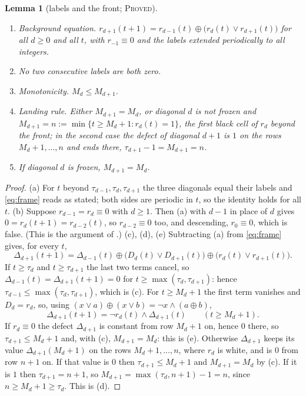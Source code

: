 \documentclass[11pt]{article}
\newtheorem{lemma}[theorem]{Lemma}
\theoremstyle{definition}
\theoremstyle{remark}
\newcommand{\PROVED}{\textsc{Proved}}
\begin{document}
\begin{lemma}[labels and the front; \PROVED]\label{lem:front}
\begin{enumerate}[label=(\alph*),leftmargin=*,itemsep=1pt]
\item \emph{Background equation.} $r_{d+1}(t+1)=r_{d-1}(t)\oplus\bigl(r_d(t)\vee r_{d+1}(t)\bigr)$ for all $d\ge0$ and all $t$, with $r_{-1}\equiv0$ and the labels extended periodically to all integers.
\item No two consecutive labels are both zero.
\item \emph{Monotonicity.} $M_d\le M_{d+1}$.
\item \emph{Landing rule.} Either $M_{d+1}=M_d$, or diagonal $d$ is not frozen and $M_{d+1}=n:=\min\{t\ge M_d+1: r_d(t)=1\}$, the first black cell of $r_d$ beyond the front; in the second case the defect of diagonal $d+1$ is $1$ on the rows $M_d+1,\dots,n$ and ends there, $\tau_{d+1}-1=M_{d+1}=n$.
\item If diagonal $d$ is frozen, $M_{d+1}=M_d$.
\end{enumerate}
\end{lemma}

\begin{proof}
(a) For $t$ beyond $\tau_{d-1},\tau_d,\tau_{d+1}$ the three diagonals equal their labels and \eqref{eq:frame} reads as stated; both sides are periodic in $t$, so the identity holds for all $t$.
(b) Suppose $r_{d-1}=r_d\equiv0$ with $d\ge1$. Then (a) with $d-1$ in place of $d$ gives $0=r_d(t+1)=r_{d-2}(t)$, so $r_{d-2}\equiv0$ too, and descending, $r_0\equiv0$, which is false. (This is the argument of \cite[Proposition~3.3]{GG}.)
(c), (d), (e) Subtracting (a) from \eqref{eq:frame} gives, for every $t$,
\[
\Delta_{d+1}(t+1)=\Delta_{d-1}(t)\oplus\bigl(D_d(t)\vee D_{d+1}(t)\bigr)\oplus\bigl(r_d(t)\vee r_{d+1}(t)\bigr).
\]
If $t\ge\tau_d$ and $t\ge\tau_{d+1}$ the last two terms cancel, so $\Delta_{d-1}(t)=\Delta_{d+1}(t+1)=0$ for $t\ge\max(\tau_d,\tau_{d+1})$: hence $\tau_{d-1}\le\max(\tau_d,\tau_{d+1})$, which is (c). For $t\ge M_d+1$ the first term vanishes and $D_d=r_d$, so, using $(x\vee a)\oplus(x\vee b)=\neg x\wedge(a\oplus b)$,
\[
\Delta_{d+1}(t+1)=\neg r_d(t)\wedge\Delta_{d+1}(t)\qquad(t\ge M_d+1).
\]
If $r_d\equiv0$ the defect $\Delta_{d+1}$ is constant from row $M_d+1$ on, hence $0$ there, so $\tau_{d+1}\le M_d+1$ and, with (c), $M_{d+1}=M_d$: this is (e). Otherwise $\Delta_{d+1}$ keeps its value $\Delta_{d+1}(M_d+1)$ on the rows $M_d+1,\dots,n$, where $r_d$ is white, and is $0$ from row $n+1$ on. If that value is $0$ then $\tau_{d+1}\le M_d+1$ and $M_{d+1}=M_d$ by (c). If it is $1$ then $\tau_{d+1}=n+1$, so $M_{d+1}=\max(\tau_d,n+1)-1=n$, since $n\ge M_d+1\ge\tau_d$. This is (d).
\end{proof}
\end{document}
